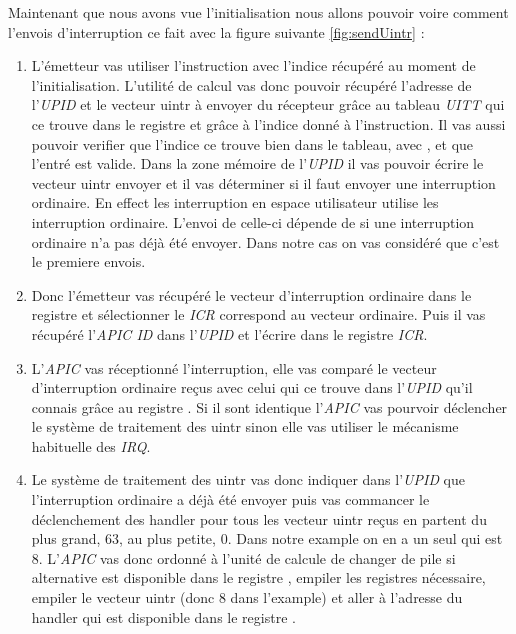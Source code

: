Maintenant que nous avons vue l'initialisation nous allons pouvoir voire comment l'envois d'interruption ce fait avec la figure suivante \ref{fig:sendUintr} :

\begin{enumerate}[label=\protect\circled{\arabic*}]
  \item L'émetteur vas utiliser l'instruction  avec l'indice récupéré au moment de l'initialisation.
  L'utilité de calcul vas donc pouvoir récupéré l'adresse de l'\emph{UPID} et le vecteur uintr à envoyer du récepteur grâce au tableau \emph{UITT} qui ce trouve dans le registre  et grâce à l'indice donné à l'instruction.
  Il vas aussi pouvoir verifier que l'indice ce trouve bien dans le tableau, avec , et que l'entré est valide.
  Dans la zone mémoire de l'\emph{UPID} il vas pouvoir écrire le vecteur uintr envoyer et il vas déterminer si il faut envoyer une interruption ordinaire.
  En effect les interruption en espace utilisateur utilise les interruption ordinaire.
  L'envoi de celle-ci dépende de si une interruption ordinaire n'a pas déjà été envoyer.
  Dans notre cas on vas considéré que c'est le premiere envois.
  \item Donc l'émetteur vas récupéré le vecteur d'interruption ordinaire dans le registre  et sélectionner le \emph{ICR} correspond au vecteur ordinaire.
  Puis il vas récupéré l'\emph{APIC ID} dans l'\emph{UPID} et l'écrire dans le registre \emph{ICR}.
  \item L'\emph{APIC} vas réceptionné l'interruption, elle vas comparé le vecteur d'interruption ordinaire reçus avec celui qui ce trouve dans l'\emph{UPID} qu'il connais grâce au registre .
  Si il sont identique l'\emph{APIC} vas pourvoir déclencher le système de traitement des uintr sinon elle vas utiliser le mécanisme habituelle des \emph{IRQ}.
  \item Le système de traitement des uintr vas donc indiquer dans l'\emph{UPID} que l'interruption ordinaire a déjà été envoyer puis vas commancer le déclenchement des handler pour tous les vecteur uintr reçus en partent du plus grand, 63, au plus petite, 0. %
  Dans notre example on en a un seul qui est 8.
  L'\emph{APIC} vas donc ordonné à l'unité de calcule de changer de pile si alternative est disponible dans
  le registre , empiler les registres nécessaire, empiler le vecteur uintr (donc 8 dans l'example) et aller à l'adresse du handler qui est disponible dans le registre .
\end{enumerate}

